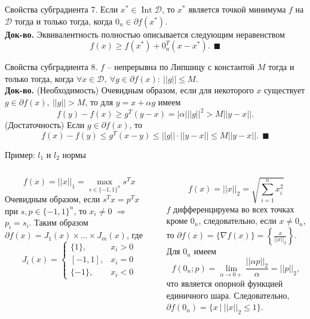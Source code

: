 \documentclass[10pt, handout]{beamer}
\DeclareMathOperator{\interior}{Int}
\begin{document}
\begin{frame}{Свойства субградиента}
7. Если $x^*\in \interior\mathcal{D}$, то $x^*$ является точкой минимума $f$ на $\mathcal{D}$ тогда и только тогда, когда $0_n\in\partial f(x^*)$.\\
\vspace{1em}
\pause
\textbf{Док-во.} Эквивалентность полностью описывается следующим неравенством
$$
f(x)\geq f(x^*)+0_n^T(x-x^*).~~\blacksquare
$$
\end{frame}

\begin{frame}{Свойства субградиента}
8. $f$ -- непрерывна по Липшицу с константой $M$ тогда и только тогда, когда $\forall x\in\mathcal{D},~\forall g\in \partial f(x):~||g||\leq M$.\\
\pause
\vspace{1em}
\textbf{Док-во.} (Необходимость) Очевидным образом, если для некоторого $x$ существует $g\in\partial f(x),~||g||>M$, то для $y=x+\alpha g$ имеем
$$
f(y)-f(x)\geq g^T(y-x)=|\alpha|||g||^2> M||y-x||.
$$
\vspace{1em}
\pause
(Достаточность) Если $g\in \partial f(x)$, то
$$
f(x)-f(y)\leq g^T(x-y)\leq ||g||\cdot ||y-x||\leq M||y-x||.~~\blacksquare
$$
\end{frame}

\begin{frame}{Пример: $l_1$ и $l_2$ нормы}
\begin{columns}
\begin{column}{.5\textwidth}
$$
f(x)=||x||_1=\max_{s\in\{-1, 1\}^n}s^Tx
$$
Очевидным образом, если $s^Tx=p^Tx$ при $s, p\in\{-1, 1\}^n$, то $x_i\neq 0$ $\Rightarrow$  $p_i=s_i$. Таким образом $\partial f(x)=J_1(x)\times\ldots\times J_m(x)$, где
$$
J_i(x)=\begin{cases}
\{1\}, & x_i > 0\\
[-1, 1], & x_i=0\\
\{-1\}, & x_i < 0
\end{cases}
$$
\end{column}
\begin{column}{.5\textwidth}
$$
f(x)=||x||_2=\sqrt{\sum_{i=1}^nx_i^2}
$$
$f$ дифференцируема во всех точках кроме $0_n$, следовательно, если $x\neq 0_n$, то $\partial f(x)=\{\nabla f(x)\}=\left\{\frac{x}{||x||_2}\right\}$. Для $0_n$ имеем
$$
f(0_n;p)=\lim_{\alpha\rightarrow 0+}\frac{||\alpha p||_2}{\alpha}=||p||_2,
$$
что является опорной функцией единичного шара. Следовательно, $\partial f(0_n)=\{x~|~||x||_2\leq 1\}$.

\end{column}
\end{columns}
\end{frame}
\end{document}
